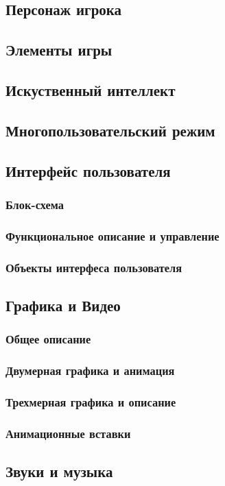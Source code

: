 \documentclass[article,12pt, fleqn]{article}
\begin{document}
\begin{itemize}
\subsection{Персонаж игрока}
\subsection{Элементы игры}
\subsection{Искуственный интеллект}
\subsection{Многопользовательский режим}
\subsection{Интерфейс пользователя}
\subsubsection{Блок-схема}
\subsubsection{Функциональное описание и управление}
\subsubsection{Объекты интерфеса пользователя}
\subsection{Графика и Видео}
\subsubsection{Общее описание}
\subsubsection{Двумерная графика и анимация}
\subsubsection{Трехмерная графика и описание}
\subsubsection{Анимационные вставки}
\subsection{Звуки и музыка}

\end{itemize}
\end{document}
